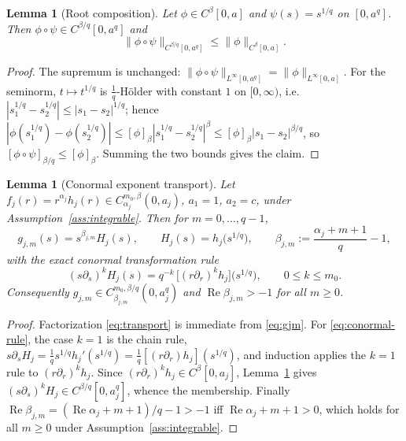 \documentclass[pdflatex,sn-mathphys-num]{sn-jnl}%
\newcommand{\Real}{\operatorname{Re}}
\theoremstyle{thmstyleone}
\newtheorem{lemma}[theorem]{Lemma}
\theoremstyle{thmstyletwo}
\theoremstyle{thmstylethree}
\begin{document}
\begin{lemma}[Root composition]\label{lem:root-comp}
Let $\phi\in C^{\beta}[0,a]$ and $\psi(s)=s^{1/q}$ on $[0,a^{q}]$. Then
$\phi\circ\psi\in C^{\beta/q}[0,a^{q}]$ and
\[
  \|\phi\circ\psi\|_{C^{\beta/q}[0,a^{q}]}\le \|\phi\|_{C^{\beta}[0,a]} .
\]
\end{lemma}

\begin{proof}
The supremum is unchanged: $\|\phi\circ\psi\|_{L^\infty[0,a^{q}]}
=\|\phi\|_{L^\infty[0,a]}$. For the seminorm, $t\mapsto t^{1/q}$ is
$\tfrac1q$-H\"older with constant $1$ on $[0,\infty)$, i.e.
$|s_1^{1/q}-s_2^{1/q}|\le|s_1-s_2|^{1/q}$; hence
$|\phi(s_1^{1/q})-\phi(s_2^{1/q})|\le[\phi]_{\beta}|s_1^{1/q}-s_2^{1/q}|^{\beta}
\le[\phi]_{\beta}|s_1-s_2|^{\beta/q}$, so
$[\phi\circ\psi]_{\beta/q}\le[\phi]_{\beta}$. Summing the two bounds gives the
claim.
\end{proof}

\begin{lemma}[Conormal exponent transport]\label{lem:transport}
Let $f_j(r)=r^{\alpha_j}h_j(r)\in C^{m_0,\beta}_{\alpha_j}(0,a_j)$, $a_1=1$,
$a_2=c$, under Assumption~\ref{ass:integrable}. Then for $m=0,\dots,q-1$,
\begin{equation}\label{eq:transport}
  g_{j,m}(s)=s^{\beta_{j,m}}H_{j}(s),\qquad
  H_{j}(s)=h_j\!\bigl(s^{1/q}\bigr),\qquad
  \beta_{j,m}:=\frac{\alpha_j+m+1}{q}-1 ,
\end{equation}
with the exact conormal transformation rule
\begin{equation}\label{eq:conormal-rule}
  (s\partial_s)^{k}H_j(s)
  =q^{-k}\,\bigl[(r\partial_r)^{k}h_j\bigr]\!\bigl(s^{1/q}\bigr),
  \qquad 0\le k\le m_0 .
\end{equation}
Consequently $g_{j,m}\in C^{m_0,\beta/q}_{\beta_{j,m}}(0,a_j^{q})$ and
$\Real\beta_{j,m}>-1$ for all $m\ge0$.
\end{lemma}

\begin{proof}
Factorization \eqref{eq:transport} is immediate from \eqref{eq:gjm}. For
\eqref{eq:conormal-rule}, the case $k=1$ is the chain rule,
$s\partial_s H_j=\tfrac1q s^{1/q}h_j'(s^{1/q})=\tfrac1q[(r\partial_r)h_j](s^{1/q})$,
and induction applies the $k=1$ rule to $(r\partial_r)^{k}h_j$. Since
$(r\partial_r)^{k}h_j\in C^{\beta}[0,a_j]$, Lemma~\ref{lem:root-comp} gives
$(s\partial_s)^{k}H_j\in C^{\beta/q}[0,a_j^{q}]$, whence the membership. Finally
$\Real\beta_{j,m}=(\Real\alpha_j+m+1)/q-1>-1$ iff $\Real\alpha_j+m+1>0$, which
holds for all $m\ge0$ under Assumption~\ref{ass:integrable}.
\end{proof}
\end{document}
